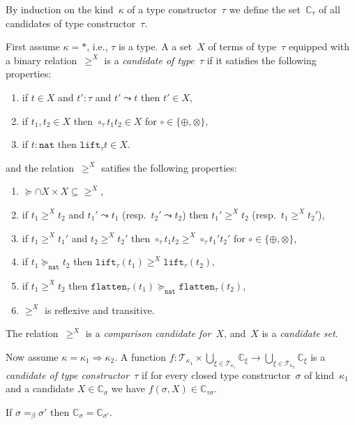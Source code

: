 \documentclass[runningheads,a4paper]{llncs}
\newcommand{\arrkind}{\Rightarrow}
\newcommand{\Tc}{\mathcal{T}}
\newcommand{\nat}{\mathtt{nat}}
\newcommand{\flatten}{\mathtt{flatten}}
\newcommand{\lift}{\mathtt{lift}}
\newcommand{\Cb}{\mathbb{C}}
\begin{document}
\begin{definition}\label{def_wm_candidate}\normalfont
  By induction on the kind~$\kappa$ of a type constructor~$\tau$ we
  define the set~$\Cb_\tau$ of all candidates of type
  constructor~$\tau$.

  First assume $\kappa=*$, i.e., $\tau$ is a type. A a set~$X$ of
  terms of type~$\tau$ equipped with a binary relation~$\ge^X$ is a
  \emph{candidate of type~$\tau$} if it satisfies the following
  properties:
  \begin{enumerate}
  \item if $t \in X$ and $t' : \tau$ and $t' \leadsto t$ then $t' \in
    X$,
  \item if $t_1,t_2 \in X$ then $\circ_\tau t_1 t_2 \in X$ for $\circ
    \in \{\oplus,\otimes\}$,
  \item if $t : \nat$ then $\lift_\tau t \in X$.
  \end{enumerate}
  and the relation~$\ge^X$ satifies the following properties:
  \begin{enumerate}
  \item ${\succeq} \cap X \times X \subseteq {\ge^X}$,
  \item if $t_1 \ge^X t_2$ and $t_1' \leadsto t_1$ (resp.~$t_2'
    \leadsto t_2$) then $t_1' \ge^X t_2$ (resp.~$t_1 \ge^X t_2'$),
  \item if $t_1 \ge^X t_1'$ and $t_2 \ge^X t_2'$ then $\circ_\tau t_1
    t_2 \ge^X \circ_\tau t_1' t_2'$ for $\circ \in
    \{\oplus,\otimes\}$,
  \item if $t_1 \succeq_\nat t_2$ then $\lift_\tau(t_1) \ge^X
    \lift_\tau(t_2)$,
  \item if $t_1 \ge^X t_2$ then $\flatten_\tau(t_1) \succeq_\nat
    \flatten_\tau(t_2)$,
  \item $\ge^X$ is reflexive and transitive.
  \end{enumerate}
  The relation~$\ge^X$ is a \emph{comparison candidate for~$X$},
  and~$X$ is a \emph{candidate set}.

  Now assume $\kappa = \kappa_1\arrkind\kappa_2$. A function $f :
  \Tc_{\kappa_1} \times \bigcup_{\xi\in\Tc_{\kappa_1}}\Cb_\xi \to
  \bigcup_{\xi\in\Tc_{\kappa_2}}\Cb_\xi$ is a \emph{candidate of type
    constructor~$\tau$} if for every closed type constructor~$\sigma$
  of kind~$\kappa_1$ and a candidate $X \in \Cb_\sigma$ we have
  $f(\sigma,X) \in \Cb_{\tau\sigma}$.
\end{definition}

\begin{lemma}\label{lem_beta_wm_candidate}
  If $\sigma =_\beta \sigma'$ then $\Cb_\sigma = \Cb_{\sigma'}$.
\end{lemma}
\end{document}
